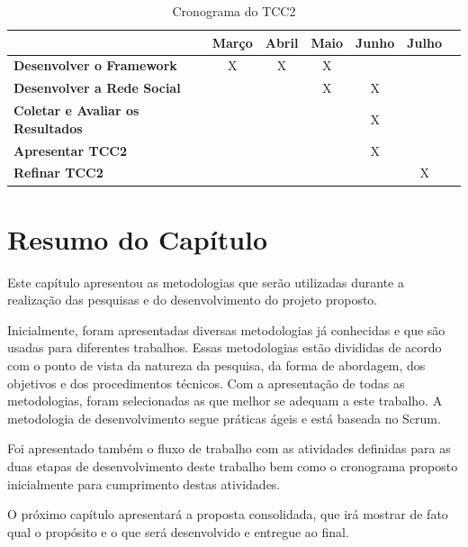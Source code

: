 \begin{table}[h]
\centering
\caption{Cronograma do TCC2}
\label{cronograma tcc2}
\begin{tabular}{|l|c|c|c|c|c|c|}
\hline
                                      			& \multicolumn{1}{l|}{\textbf{Março}} & \multicolumn{1}{l|}{\textbf{Abril}} & \multicolumn{1}{l|}{\textbf{Maio}} & \multicolumn{1}{l|}{\textbf{Junho}} & \multicolumn{1}{l|}{\textbf{Julho}} \\ \hline
\textbf{Desenvolver o Framework}                & X                           		  & X                              		& X                            		 &                               	   &                               		 \\ \hline
\textbf{Desenvolver a Rede Social}              &                            		  &                               		& X                            		 & X                              	   &                               		 \\ \hline
\textbf{Coletar e Avaliar os Resultados}	    &                            		  &                              		&                             		 & X                             	   &                               		 \\ \hline
\textbf{Apresentar TCC2}						&                             		  &                              		&                             		 & X                              	   &                               		 \\ \hline
\textbf{Refinar TCC2}				            &                             		  &                               		&                             		 &                               	   & X                             		 \\ \hline
\end{tabular}
\end{table}

\section{Resumo do Capítulo}

Este capítulo apresentou as metodologias que serão utilizadas durante a realização das pesquisas e do desenvolvimento do projeto proposto.

Inicialmente, foram apresentadas diversas metodologias já conhecidas e que são usadas para diferentes trabalhos. Essas metodologias estão divididas de acordo com o ponto de vista da natureza da pesquisa, da forma de abordagem, dos objetivos e dos procedimentos técnicos. Com a apresentação de todas as metodologias, foram selecionadas as que melhor se adequam a este trabalho. A metodologia de desenvolvimento segue práticas ágeis e está baseada no Scrum.

Foi apresentado também o fluxo de trabalho com as atividades definidas para as duas etapas de desenvolvimento deste trabalho bem como o cronograma proposto inicialmente para cumprimento destas atividades.

O próximo capítulo apresentará a proposta consolidada, que irá mostrar de fato qual o propósito e o que será desenvolvido e entregue ao final.
